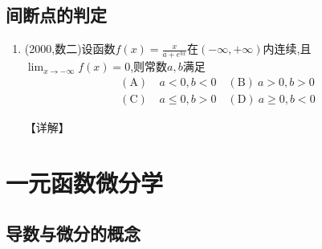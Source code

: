 \documentclass[12pt, a4paper, oneside, UTF8]{ctexbook}
\begin{document}
\subsection{间断点的判定}

\begin{enumerate}[label=\arabic*.,start=19]
    \item  (2000,数二)设函数$f(x)=\frac{x}{a+e^{bx}}$在$(-\infty,+\infty)$内连续,且$\lim_{x\to-\infty}f(x)=0$,则常数$a,b$满足
    \begin{align*}
        (\text{A})&\ a<0,b<0 \quad (\text{B})\ a>0,b>0 \\
        (\text{C})&\ a\leq0,b>0 \quad (\text{D})\ a\geq0,b<0
    \end{align*}
    
    \begin{solution}
    【详解】
    \end{solution}
\end{enumerate}

\section{一元函数微分学}

\subsection{导数与微分的概念}
\end{document}
